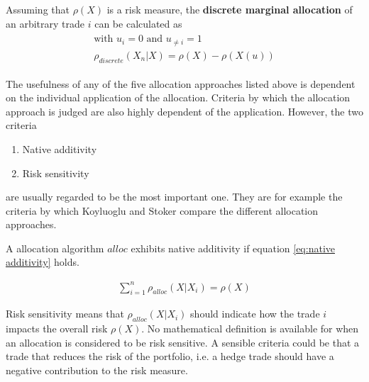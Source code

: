 \documentclass[../Thesis_AHoecherl.tex]{subfiles}
\begin{document}
\begin{definition}
    Assuming that $\rho(X)$ is a risk measure, the \textbf{discrete marginal allocation} of an arbitrary trade $i$ can be calculated as
    \begin{gather}
        \begin{split}
            \text{with } u_{i} = 0 \text{ and } u_{\neq i} = 1\\
            \rho_{discrete}\left(X_n|X\right) = \rho\left(X\right) - \rho\left(X\left(u\right)\right)    
        \end{split}
    \end{gather}
\end{definition}

\begin{definition}
\end{definition}

The usefulness of any of the five allocation approaches listed above is dependent on the individual application of the allocation. Criteria by which the allocation approach is judged are also highly dependent of the application. However, the two criteria
\begin{enumerate}
    \item Native additivity
    \item Risk sensitivity
\end{enumerate}
are usually regarded to be the most important one. They are for example the criteria by which Koyluoglu and Stoker \cite{koyluoglu2002risk} compare the different allocation approaches.

A allocation algorithm $alloc$ exhibits native additivity if equation \ref{eq:native additivity} holds.

\begin{align}
    \sum_{i=1}^n{\rho_{alloc}\left(X|X_i\right)} = \rho\left(X\right)
    \label{eq:native additivity}
\end{align}

Risk sensitivity means that $\rho_{alloc}\left(X|X_i\right)$ should indicate how the trade $i$ impacts the overall risk $\rho\left(X\right)$. 
No mathematical definition is available for when an allocation is considered to be risk sensitive. A sensible criteria could be that a trade that reduces the risk of the portfolio, i.e. a hedge trade should have a negative contribution to the risk measure.
\end{document}

